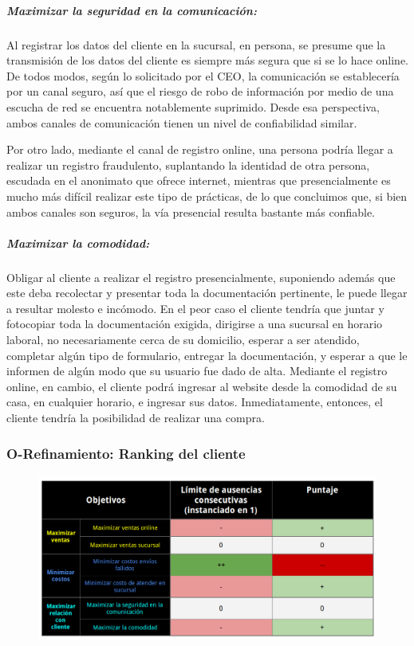 \subparagraph{Maximizar la seguridad en la comunicación:}

Al registrar los datos del cliente en la sucursal, en persona, se presume que la
transmisión de los datos del cliente es siempre más segura que si se lo hace
online. De todos modos, según lo solicitado por el CEO, la comunicación se
establecería por un canal seguro, así que el riesgo de robo de información por
medio de una escucha de red se encuentra notablemente suprimido. Desde esa
perspectiva, ambos canales de comunicación tienen un nivel de confiabilidad
similar.

Por otro lado, mediante el canal de registro online, una persona podría llegar a
realizar un registro fraudulento, suplantando la identidad de otra persona,
escudada en el anonimato que ofrece internet, mientras que presencialmente es
mucho más difícil realizar este tipo de prácticas, de lo que concluimos que, si
bien ambos canales son seguros, la vía presencial resulta bastante más
confiable.

\subparagraph{Maximizar la comodidad:}

Obligar al cliente a realizar el registro presencialmente, suponiendo además que
este deba recolectar y presentar toda la documentación pertinente, le puede
llegar a resultar molesto e incómodo. En el peor caso el cliente tendría que
juntar y fotocopiar toda la documentación exigida, dirigirse a una sucursal en
horario laboral, no necesariamente cerca de su domicilio, esperar a ser
atendido, completar algún tipo de formulario, entregar la documentación, y
esperar a que le informen de algún modo que su usuario fue dado de alta.
Mediante el registro online, en cambio, el cliente podrá ingresar al website
desde la comodidad de su casa, en cualquier horario, e ingresar sus datos.
Inmediatamente, entonces, el cliente tendría la posibilidad de realizar una
compra.

\newpage
\subsubsection{O-Refinamiento: Ranking del cliente}
\begin{figure}[H]
  \includegraphics[width=\linewidth]{images/objetivo-blando-ranking-cliente.png}
\end{figure}


